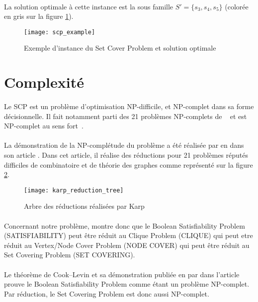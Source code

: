 \documentclass[12pt,letterpaper,twoside]{article}
\begin{document}
		\paragraph*{}
			La solution optimale à cette instance est la sous famille \(S'=\{s_3, s_4, s_5\}\) (colorée en gris sur la figure \ref{fig:example}).
		\begin{figure}[H]
			\centering%
			\texttt{[image: scp\_example]}%
			\caption{Exemple d'instance du Set Cover Problem et solution optimale\cite{Mount2017}}%
			\label{fig:example}%
		\end{figure}
	\section{Complexité}
		\paragraph*{}
			Le SCP est un problème d'optimisation NP-difficile, et NP-complet dans sa forme décisionnelle. Il fait notamment parti des 21 problèmes NP-complets de \citeauthor{Karp1972}~\cite{Karp1972} et est NP-complet au sens fort~\cite{garey2002computers}.
		\paragraph*{}
			La démonstration de la NP-complétude du problème a été réalisée par \citeauthor{Karp1972} en \citeyear{Karp1972} dans son article \cite{Karp1972}. Dans cet article, il réalise des réductions pour 21 problèmes réputés difficiles de combinatoire et de théorie des graphes comme représenté sur la figure \ref{fig:karp_reduction_tree}.
		\begin{figure}[H]
			\centering%
			\texttt{[image: karp\_reduction\_tree]}%
			\caption{Arbre des réductions réalisées par Karp\cite{Karp1972}}%
			\label{fig:karp_reduction_tree}%
		\end{figure}
		\paragraph*{}
			Concernant notre problème, \citeauthor{Karp1972} montre donc que le Boolean Satisfiability Problem (SATISFIABILITY) peut être réduit au Clique Problem (CLIQUE) qui peut etre réduit au Vertex/Node Cover Problem (NODE COVER) qui peut être réduit au Set Covering Problem (SET COVERING).
		\paragraph*{}
			Le théorème de Cook–Levin et sa démonstration publiée en \citeyear{Cook1971} par \citeauthor{Cook1971} dans l'article \cite{Cook1971} prouve le Boolean Satisfiability Problem comme étant un problème NP-complet. Par réduction, le Set Covering Problem est donc aussi NP-complet.
\end{document}

